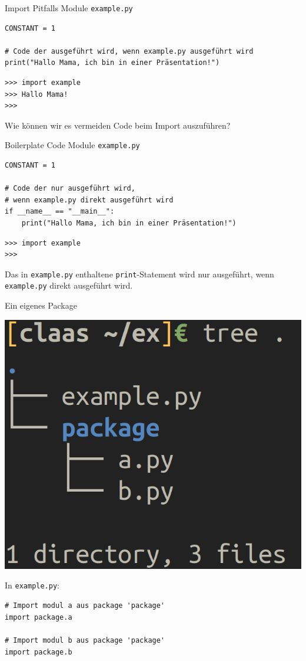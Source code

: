 \begin{frame}[fragile]{Import Pitfalls}
Module \texttt{example.py}
\begin{lstlisting}
CONSTANT = 1

# Code der ausgeführt wird, wenn example.py ausgeführt wird
print("Hallo Mama, ich bin in einer Präsentation!")
\end{lstlisting}

\begin{lstlisting}
>>> import example
>>> Hallo Mama!
>>>
\end{lstlisting}
Wie können wir es vermeiden Code beim Import auszuführen?
\end{frame}

\begin{frame}[fragile]{Boilerplate Code}
Module \texttt{example.py}
\begin{lstlisting}
CONSTANT = 1

# Code der nur ausgeführt wird,
# wenn example.py direkt ausgeführt wird
if __name__ == "__main__":
    print("Hallo Mama, ich bin in einer Präsentation!")
\end{lstlisting}

\begin{lstlisting}
>>> import example
>>>
\end{lstlisting}
    Das in \texttt{example.py} enthaltene \texttt{print}-Statement wird nur ausgeführt, wenn \texttt{example.py} direkt ausgeführt wird.
\end{frame}

\begin{frame}[fragile]{Ein eigenes Package}
    \begin{center}
    \includegraphics[height=.4\textheight]{Package.png}
    \end{center}
    In \texttt{example.py}:
    \begin{lstlisting}
# Import modul a aus package 'package'
import package.a

# Import modul b aus package 'package'
import package.b
\end{lstlisting}
\end{frame}

